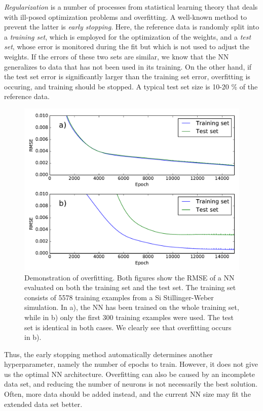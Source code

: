 \documentclass[twoside,english]{uiofysmaster}
\begin{document}
\textit{Regularization} is a number of processes from statistical learning theory that deals with ill-posed optimization
problems and overfitting. A well-known method to prevent the latter is \textit{early stopping}. 
Here, the reference data is randomly split into 
a \textit{training set}, which is employed for the optimization of the weights, and a \textit{test set}, whose error is monitored
during the fit but which is not used to adjust the weights. If the errors of these two sets are similar, we know that the NN
generalizes to data that has not been used in its training. On the other hand, if the test set error is significantly larger
than the training set error, overfitting is occuring, and training should be stopped. 
A typical test set size is 10-20 \% of the reference data. 
\begin{figure}
\centering
  \includegraphics[width = 0.8\linewidth]{Figures/Implementation/overfitting.pdf}
  \caption{Demonstration of overfitting. Both figures show the RMSE of a NN evaluated on both the training set and 
	   the test set. The training set consists of 5578 training examples from a Si Stillinger-Weber simulation.
	   In a), the NN has been trained on 
	   the whole training set, while in b) only the first 300 training examples were used. The test set is 
	   identical in both cases. We clearly see that overfitting occurs in b).}
  \label{fig:overfitting}
\end{figure}

Thus, the early stopping method automatically determines another hyperparameter, namely the number of epochs to train. 
However, it does not give us the optimal NN architecture. Overfitting can also be caused by an incomplete data set, 
and reducing the number of neurons is not necessarily the best solution. Often, more data should be added instead, 
and the current NN size may fit the extended data set better. 
\end{document}

